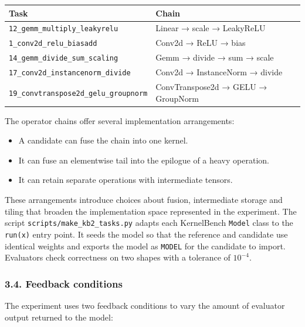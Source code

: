 \documentclass[
  11pt,
]{article}
\providecommand{\tightlist}{%
  \setlength{\itemsep}{0pt}\setlength{\parskip}{0pt}}
\begin{document}
\begin{center}
\begin{minipage}{\linewidth}
\centering
\begin{tabular}{@{}ll@{}}
\toprule
Task & Chain \\
\midrule

\texttt{12\_gemm\_multiply\_leakyrelu} & Linear → scale → LeakyReLU \\
\texttt{1\_conv2d\_relu\_biasadd} & Conv2d → ReLU → bias \\
\texttt{14\_gemm\_divide\_sum\_scaling} & Gemm → divide → sum → scale \\
\texttt{17\_conv2d\_instancenorm\_divide} & Conv2d → InstanceNorm →
divide \\
\texttt{19\_convtranspose2d\_gelu\_groupnorm} & ConvTranspose2d → GELU →
GroupNorm \\
\bottomrule
\end{tabular}
\end{minipage}
\end{center}

The operator chains offer several implementation arrangements:

\begin{itemize}
\tightlist
\item
  A candidate can fuse the chain into one kernel.
\item
  It can fuse an elementwise tail into the epilogue of a heavy
  operation.
\item
  It can retain separate operations with intermediate tensors.
\end{itemize}

These arrangements introduce choices about fusion, intermediate storage
and tiling that broaden the implementation space represented in the
experiment. The script \texttt{scripts/make\_kb2\_tasks.py} adapts each
KernelBench \texttt{Model} class to the \texttt{run(x)} entry point. It
seeds the model so that the reference and candidate use identical
weights and exports the model as \texttt{MODEL} for the candidate to
import. Evaluators check correctness on two shapes with a tolerance of
\(10^{-4}\).

\hypertarget{feedback-conditions}{%
\subsubsection{3.4. Feedback conditions}\label{feedback-conditions}}

The experiment uses two feedback conditions to vary the amount of
evaluator output returned to the model:
\end{document}
